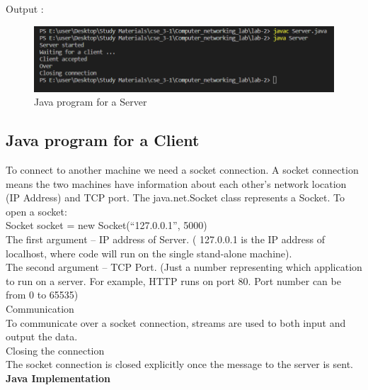 \documentclass[11pt]{article}
\begin{document}
 Output : 
  \begin{figure}[!h]
\centering
\includegraphics[width=\textwidth]{server.png}
\caption{Java program for a Server}
\end{figure}
\FloatBarrier


\subsection{Java program for a Client}
To connect to another machine we need a socket connection. A socket connection means the two machines have information about each other’s network location (IP Address) and TCP port. The java.net.Socket class represents a Socket. To open a socket: \\[12pt]

Socket socket = new Socket(“127.0.0.1”, 5000)\\[12pt]

    The first argument – IP address of Server. ( 127.0.0.1  is the IP address of localhost, where code will run on the single stand-alone machine).\\[6pt]
    The second argument – TCP Port. (Just a number representing which application to run on a server. For example, HTTP runs on port 80. Port number can be from 0 to 65535)\\[12pt]

Communication\\[6pt] 
To communicate over a socket connection, streams are used to both input and output the data. \\[2pt]

Closing the connection\\[6pt]

The socket connection is closed explicitly once the message to the server is sent.\\[12pt]

\textbf{Java Implementation}\\[12pt]
\end{document}

